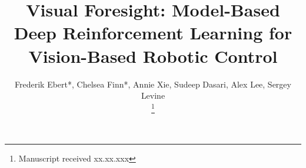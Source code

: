 \documentclass[10pt,journal,compsoc]{IEEEtran}
\begin{document}
%
\title{Visual Foresight: Model-Based Deep Reinforcement Learning for Vision-Based Robotic Control}
%
%

\author{Frederik Ebert*, Chelsea Finn*, Annie Xie, Sudeep Dasari, Alex Lee, Sergey Levine
        
\thanks{Manuscript received xx.xx.xxx}}
\end{document}
